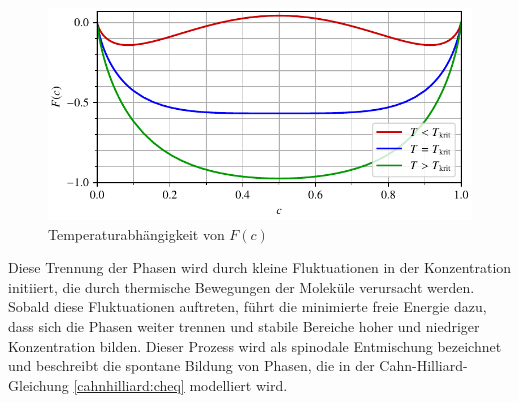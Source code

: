 \begin{figure}
\centering
\includegraphics[scale=0.8]{papers/cahnhilliard/presentation/images/energy.book.pdf}
\caption{Temperaturabhängigkeit von $F(c)$}
\label{cahnhilliard:fig:fc}
\end{figure}

Diese Trennung der Phasen wird durch kleine Fluktuationen in der Konzentration initiiert,
die durch thermische Bewegungen der Moleküle verursacht werden.
Sobald diese Fluktuationen auftreten,
führt die minimierte freie Energie dazu,
dass sich die Phasen weiter trennen und stabile Bereiche hoher
und niedriger Konzentration bilden.
Dieser Prozess wird als spinodale Entmischung bezeichnet
und beschreibt die spontane Bildung von Phasen,
die in der Cahn-Hilliard-Gleichung \eqref{cahnhilliard:cheq} modelliert wird.

